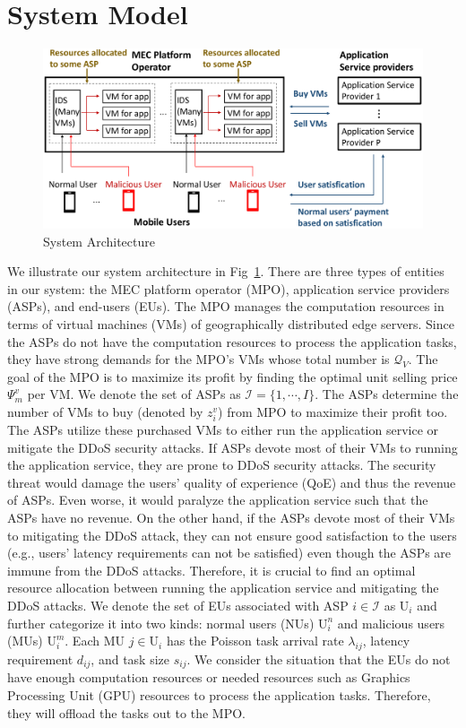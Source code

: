 \documentclass[conference]{IEEEtran}
\begin{document}
\section{System Model}
\begin{figure}[!ht]
\centering
\includegraphics[width= \columnwidth]{5GDDoS_Game_system_architecture.pdf}
\caption{System Architecture}
\label{fig:system}
\end{figure}
We illustrate our system architecture in Fig~\ref{fig:system}. There are three types of entities in our system: the MEC platform operator (MPO), application service providers (ASPs), and end-users (EUs). The MPO manages the computation resources in terms of virtual machines (VMs) of geographically distributed edge servers. Since the ASPs do not have the computation resources to process the application tasks, they have strong demands for the MPO's VMs whose total number is $\mathcal{Q}_{V}$. The goal of the MPO is to maximize its profit by finding the optimal unit selling price $\Psi_{m}^v$ per VM. We denote the set of ASPs as $\mathcal{I}=\{1, \cdots, I\}$. The ASPs determine the number of VMs to buy (denoted by $z_i^v$) from MPO to maximize their profit too. The ASPs utilize these purchased VMs to either run the application service or mitigate the DDoS security attacks. If ASPs devote most of their VMs to running the application service, they are prone to DDoS security attacks. The security threat would damage the users' quality of experience (QoE) and thus the revenue of ASPs. Even worse, it would paralyze the application service such that the ASPs have no revenue. On the other hand, if the ASPs devote most of their VMs to mitigating the DDoS attack, they can not ensure good satisfaction to the users (e.g., users' latency requirements can not be satisfied) even though the ASPs are immune from the DDoS attacks. Therefore, it is crucial to find an optimal resource allocation between running the application service and mitigating the DDoS attacks. We denote the set of EUs associated with ASP $i \in \mathcal{I}$ as $\mathrm{U}_i$ and further categorize it into two kinds: normal users (NUs) $\mathrm{U}_i^n$ and malicious users (MUs) $\mathrm{U}_i^m$. Each MU $j \in \mathrm{U}_i$ has the Poisson task arrival rate $\lambda_{ij}$, latency requirement $d_{ij}$, and task size $s_{ij}$. We consider the situation that the EUs do not have enough computation resources or needed resources such as Graphics Processing Unit (GPU) resources to process the application tasks. Therefore, they will offload the tasks out to the MPO.
\end{document}
